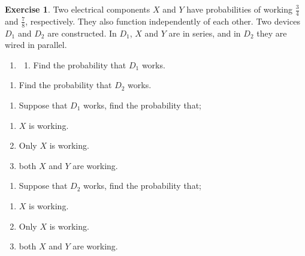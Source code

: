 \documentclass[
]{book}
\providecommand{\tightlist}{%
  \setlength{\itemsep}{0pt}\setlength{\parskip}{0pt}}
\theoremstyle{definition}
\theoremstyle{definition}
\theoremstyle{definition}
\newtheorem{exercise}{Exercise}[chapter]
\theoremstyle{definition}
\theoremstyle{remark}
\begin{document}
\begin{exercise}

Two electrical components \(X\) and \(Y\) have probabilities of working \(\frac{3}{4}\) and \(\frac{7}{8}\), respectively. They also function independently of each other. Two devices \(D_1\) and \(D_2\) are constructed. In \(D_1\), \(X\) and \(Y\) are in series, and in \(D_2\) they are wired in parallel.

\begin{enumerate}
\def\labelenumi{\alph{enumi})}
\item
  \begin{enumerate}
  \def\labelenumii{(\roman{enumii})}
  \tightlist
  \item
    Find the probability that \(D_1\) works.
  \end{enumerate}
\end{enumerate}

\begin{enumerate}
\def\labelenumi{(\roman{enumi})}
\setcounter{enumi}{1}
\tightlist
\item
  Find the probability that \(D_2\) works.
\end{enumerate}

\begin{enumerate}
\def\labelenumi{\alph{enumi})}
\setcounter{enumi}{1}
\tightlist
\item
  Suppose that \(D_1\) works, find the probability that;
\end{enumerate}

\begin{enumerate}
\def\labelenumi{(\roman{enumi})}
\tightlist
\item
  \(X\) is working.
\item
  Only \(X\) is working.
\item
  both \(X\) and \(Y\) are working.
\end{enumerate}

\begin{enumerate}
\def\labelenumi{\alph{enumi})}
\setcounter{enumi}{2}
\tightlist
\item
  Suppose that \(D_2\) works, find the probability that;
\end{enumerate}

\begin{enumerate}
\def\labelenumi{(\roman{enumi})}
\tightlist
\item
  \(X\) is working.
\item
  Only \(X\) is working.
\item
  both \(X\) and \(Y\) are working.
\end{enumerate}

\end{exercise}
\end{document}
